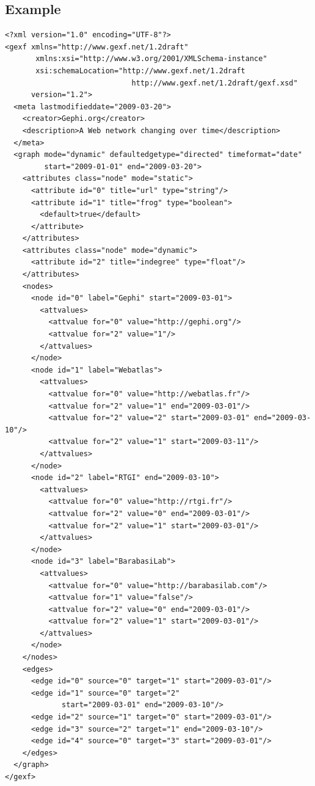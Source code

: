 \documentclass[a4paper,10pt]{article}
\begin{document}
\subsection{Example}

\lstset{ style=gexf }
\begin{lstlisting}[caption={A (small) Dynamic Web Graph with continuous time},label=dynwebgraph]
<?xml version="1.0" encoding="UTF-8"?>
<gexf xmlns="http://www.gexf.net/1.2draft"
       xmlns:xsi="http://www.w3.org/2001/XMLSchema-instance"
       xsi:schemaLocation="http://www.gexf.net/1.2draft
                             http://www.gexf.net/1.2draft/gexf.xsd"
      version="1.2">
  <meta lastmodifieddate="2009-03-20">
    <creator>Gephi.org</creator>
    <description>A Web network changing over time</description>
  </meta>
  <graph mode="dynamic" defaultedgetype="directed" timeformat="date"
         start="2009-01-01" end="2009-03-20">
    <attributes class="node" mode="static">
      <attribute id="0" title="url" type="string"/>
      <attribute id="1" title="frog" type="boolean">
        <default>true</default>
      </attribute>
    </attributes>
    <attributes class="node" mode="dynamic">
      <attribute id="2" title="indegree" type="float"/>
    </attributes>
    <nodes>
      <node id="0" label="Gephi" start="2009-03-01">
        <attvalues>
          <attvalue for="0" value="http://gephi.org"/>
          <attvalue for="2" value="1"/>
        </attvalues>
      </node>
      <node id="1" label="Webatlas">
        <attvalues>
          <attvalue for="0" value="http://webatlas.fr"/>
          <attvalue for="2" value="1" end="2009-03-01"/>
          <attvalue for="2" value="2" start="2009-03-01" end="2009-03-10"/>
          <attvalue for="2" value="1" start="2009-03-11"/>
        </attvalues>
      </node>
      <node id="2" label="RTGI" end="2009-03-10">
        <attvalues>
          <attvalue for="0" value="http://rtgi.fr"/>
          <attvalue for="2" value="0" end="2009-03-01"/>
          <attvalue for="2" value="1" start="2009-03-01"/>
        </attvalues>
      </node>
      <node id="3" label="BarabasiLab">
        <attvalues>
          <attvalue for="0" value="http://barabasilab.com"/>
          <attvalue for="1" value="false"/>
          <attvalue for="2" value="0" end="2009-03-01"/>
          <attvalue for="2" value="1" start="2009-03-01"/>
        </attvalues>
      </node>
    </nodes>
    <edges>
      <edge id="0" source="0" target="1" start="2009-03-01"/>
      <edge id="1" source="0" target="2"
             start="2009-03-01" end="2009-03-10"/>
      <edge id="2" source="1" target="0" start="2009-03-01"/>
      <edge id="3" source="2" target="1" end="2009-03-10"/>
      <edge id="4" source="0" target="3" start="2009-03-01"/>
    </edges>
  </graph>
</gexf>
\end{lstlisting}
\end{document}
